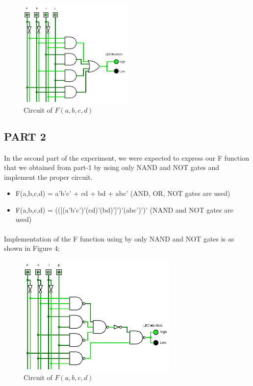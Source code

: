 \documentclass[pdftex,12pt,a4paper]{article}
\begin{document}
\begin{figure}[!h]
	\centering
	\includegraphics[width=0.5\textwidth]{part1.png}	
	\caption{Circuit of $F(a,b,c,d)$}
	\label{log1}
\end{figure}

\clearpage

\subsection{PART 2}

\paragraph{}
In the second part of the experiment, we were expected to express our F function that we obtained from part-1 by using only NAND and NOT gates and implement the proper circuit.

\begin{itemize}
    \item  F(a,b,c,d) = a'b'c' + cd + bd + abc' (AND, OR, NOT gates are used)
    \item F(a,b,c,d) = (([(a'b'c')'(cd)'(bd)']')'(abc')')' (NAND and NOT gates are used)
\end{itemize}

\paragraph{}
Implementation of the F function using by only NAND and NOT gates is as shown in Figure 4;

\begin{figure}[!h]
	\centering
	\includegraphics[width=0.7\textwidth]{part2.png}	
	\caption{Circuit of $F(a,b,c,d)$}
	\label{log2}
\end{figure}
\end{document}
